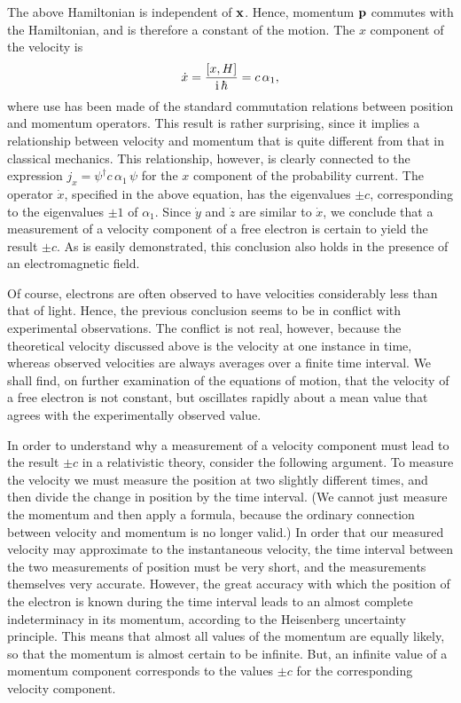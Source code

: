 The above Hamiltonian is independent of ${\bf x}$. Hence, momentum ${\bf p}$ commutes with the Hamiltonian, and is therefore a
constant of the motion. The $x$ component of the velocity is 
\begin{equation}\label{e11.80}
\dot{x} = \frac{[x,H]}{{\rm i}\,\hbar} = c\,\alpha_1,
\end{equation} 
where use has been made of the standard commutation relations between position and momentum operators. 
This result is rather surprising, since it implies a relationship between velocity and momentum that is quite different from that
in classical mechanics. This relationship, however, is clearly connected to the expression $j_x = \psi^\dag c\,\alpha_1\,\psi$ for the
$x$ component of the probability current. The operator $\dot{x}$, specified in the above equation, has the eigenvalues $\pm c$,
corresponding to the eigenvalues $\pm 1$ of $\alpha_1$. Since $\dot{y}$ and $\dot{z}$ are similar to $\dot{x}$, we
conclude that a measurement of a velocity component of a free electron is certain to yield the result $\pm c$. As is easily demonstrated, this conclusion also
holds in the presence of an electromagnetic field. 

Of course, electrons are often observed to have velocities considerably less than that of light. Hence, the previous conclusion seems to
be in conflict with experimental observations. The conflict is not real, however, because the theoretical velocity discussed above is
the velocity at one instance in time, whereas observed velocities are always averages over a finite time interval. We shall find, on
further examination of the equations of motion, that the velocity of a free electron is not constant, but oscillates rapidly about a mean value
that agrees with the experimentally observed value. 

In order to understand why a measurement of a velocity component must lead to the result $\pm c$ in a relativistic theory, consider the
following argument. To measure the velocity we must measure the position at two slightly different times, and then divide the
change in position by the time interval. (We cannot just measure the momentum and then apply a formula, because the
ordinary connection between velocity and momentum is no longer valid.) In order that our measured velocity may
approximate to the instantaneous velocity, the time interval between the two measurements of position must be very short, and the
measurements themselves very accurate. However, the great accuracy with which the position of the electron
is known during the time interval leads to an almost complete indeterminacy in its momentum, according to the Heisenberg uncertainty principle. 
This means that almost all values of the momentum are equally likely, so that the momentum is almost certain to be infinite. But, an infinite
value of a momentum component corresponds to the values $\pm c$ for the corresponding velocity component. 

